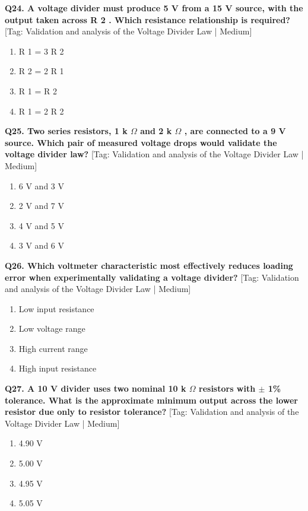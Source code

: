 \noindent\textbf{Q24. A voltage divider must produce 5 V from a 15 V source, with the output taken across R 2 . Which resistance relationship is required?} \hfill [Tag: Validation and analysis of the Voltage Divider Law | Medium]
\begin{enumerate}[label=(\alph*),topsep=2pt,itemsep=1pt,partopsep=0pt,parsep=0pt]
    \item {R 1 = 3 R 2}
    \item {R 2 = 2 R 1}
    \item {R 1 = R 2}
    \item {R 1 = 2 R 2}
\end{enumerate}
\vspace{2mm}

\noindent\textbf{Q25. Two series resistors, 1 k $\Omega$ and 2 k $\Omega$ , are connected to a 9 V source. Which pair of measured voltage drops would validate the voltage divider law?} \hfill [Tag: Validation and analysis of the Voltage Divider Law | Medium]
\begin{enumerate}[label=(\alph*),topsep=2pt,itemsep=1pt,partopsep=0pt,parsep=0pt]
    \item {6 V and 3 V}
    \item {2 V and 7 V}
    \item {4 V and 5 V}
    \item {3 V and 6 V}
\end{enumerate}
\vspace{2mm}

\noindent\textbf{Q26. Which voltmeter characteristic most effectively reduces loading error when experimentally validating a voltage divider?} \hfill [Tag: Validation and analysis of the Voltage Divider Law | Medium]
\begin{enumerate}[label=(\alph*),topsep=2pt,itemsep=1pt,partopsep=0pt,parsep=0pt]
    \item {Low input resistance}
    \item {Low voltage range}
    \item {High current range}
    \item {High input resistance}
\end{enumerate}
\vspace{2mm}

\noindent\textbf{Q27. A 10 V divider uses two nominal 10 k $\Omega$ resistors with $\pm$ 1\% tolerance. What is the approximate minimum output across the lower resistor due only to resistor tolerance?} \hfill [Tag: Validation and analysis of the Voltage Divider Law | Medium]
\begin{enumerate}[label=(\alph*),topsep=2pt,itemsep=1pt,partopsep=0pt,parsep=0pt]
    \item {4.90 V}
    \item {5.00 V}
    \item {4.95 V}
    \item {5.05 V}
\end{enumerate}
\vspace{2mm}

